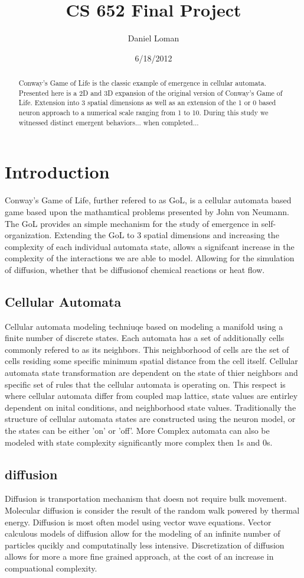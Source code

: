 \documentclass[11pt,twocolumn]{article}
\title{\textbf{CS 652 Final Project }}
\author{Daniel Loman}
\date{6/18/2012}
\begin{document}
\maketitle
\begin{abstract}
Conway's Game of Life is the classic example of emergence in cellular automata. Presented here is a 2D and 3D expansion of the original version of Conway's Game of Life. Extension into 3 spatial dimensions as well as an extension of the 1 or 0 based neuron approach to a numerical scale ranging from 1 to 10. During this study we witnessed distinct emergent behaviors... when completed...
\end{abstract}
\section{Introduction}
Conway's Game of Life, further refered to as GoL, is a cellular automata based game based upon the mathamtical problems presented by John von Neumann. The GoL provides an simple mechanism for the study of emergence in self-organization.
Extending the GoL to 3 spatial dimensions and increasing the complexity of each individual automata state, allows a signifcant increase in the complexity of the interactions we are able to model. 
Allowing for the simulation of diffusion, whether that be diffusionof chemical reactions or heat flow.  
\subsection{Cellular Automata}
 Cellular automata modeling techniuqe based on modeling a manifold 
 using a finite number of discrete states. 
 Each automata has a set of additionally cells commonly refered to as its neighbors. 
 This neighborhood of cells are the set of cells residing some specific minimum spatial distance from the cell itself. 
 Cellular automata state transformation are dependent on the state of thier neighbors and specific set of rules that the cellular automata is operating on. 
 This respect is where cellular automata differ from coupled map lattice, state values are entirley dependent on inital conditions, and neighborhood state values.
 Traditionally the structure of cellular automata states are constructed using the neuron model, or the states can be either 'on' or 'off'. 
 More Complex automata can also be modeled with state complexity significantly more complex then 1s and 0s.
 \subsection{diffusion}
 Diffusion is transportation mechanism that doesn not require bulk movement. 
 Molecular diffusion is consider the result of the random walk powered by thermal energy. 
 Diffusion is most often model using vector wave equations. Vector calculous models of diffusion allow for the modeling of an infinite number of particles qucikly and computatinally less intensive. 
 Discretization of diffusion allows for more a more fine grained approach, at the cost of an increase in compuational complexity.
\end{document}
